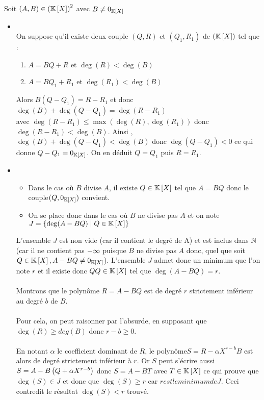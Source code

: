 \begin{dem}
    Soit \(\left(A,B\right) \in \left(\mathbb{K} \left[X\right]\right)^2\) avec \(B \neq 0_{\mathbb{K} \left[X\right]}\)
    \begin{itemize}
        \item \unicite\\
        On suppose qu'il existe deux couple \((Q,R)\) et \((Q_1, R_1)\) de \(\left(\mathbb{K}\left[X\right]\right)\) tel que : 
        \begin{enumerate}
            \item \(A = BQ + R\) et \(\deg(R)<\deg(B)\)
            \item \(A = BQ_1 + R_1\) et \(\deg(R_1)<\deg(B)\)
        \end{enumerate}
        Alors \(B(Q-Q_1) = R-R_1\) et donc \(\deg(B) + \deg( Q-Q_1) = \deg(R-R_1)\)\\
        avec \(\deg(R-R_1) \leq \max(\deg(R),\deg(R_1))\) donc \(\deg(R-R_1) < \deg(B)\).
        Ainsi , \(\deg(B) + \deg( Q-Q_1) < \deg(B)\) donc \(\deg( Q-Q_1) < 0\) ce qui donne \(Q - Q_1 = 0 _{\mathbb{K} \left[X\right]}\). On en déduit \(Q = Q_1\) puis \(R = R_1\).
        \item \existence
        \begin{itemize}
            \item Dans le cas où \(B\) divise \(A\), il existe \(Q \in \mathbb{K} \left[X\right]\) tel que \(A = BQ\) donc le couple\( (Q, 0_{\mathbb{K}\left[X\right]})\) convient.
            \item On se place donc dans le cas où \(B\) ne divise pas \(A\) et on note \(J = \left\lbrace\deg (A - BQ) \;\middle|\; Q \in \mathbb{K} \left[X\right]\right\rbrace\)
        \end{itemize}
        L’ensemble \(J\) est non vide (car il contient le degré de \(\)A) et est inclus dans \(\mathbb{N}\) (car il ne contient pas \(-\infty\) puisque \(B\) ne divise pas \(A\) donc, quel que soit \(Q \in \mathbb{K} \left[X\right], A - BQ\neq 0_{\mathbb{K}\left[X\right]}\)). L’ensemble \(J\) admet donc un minimum que l’on note \(r\) et il existe donc \(Q Q \in \mathbb{K} \left[X\right]\) tel que \(\deg (A - BQ) = r\).\\~\\
        Montrons que le polynôme \(R = A - BQ\) est de degré \(r\) strictement inférieur au degré \(b\) de \(B\).\\~\\
        Pour cela, on peut raisonner par l’absurde, en supposant que \(\deg (R) \geq deg (B)\) donc \(r - b \geq 0\).\\~\\
        En notant \(\alpha\) le coefficient dominant de \(R\), le polynôme\( S = R - \alpha X^{r-b}B\) est alors de degré strictement inférieur à \(r\). Or \(S\) peut s’écrire aussi \(S = A - B\left(Q + \alpha X^{r-b}\right)\) donc \(S = A - BT\) avec \(T \in \mathbb{K} \left[X\right]\) ce qui prouve que \(\deg (S) \in J\) et donc que \(\deg (S) \geq r\) car \(r est le minimum de J\). Ceci contredit le résultat \(\deg (S) < r\) trouvé.\\~\\

\end{itemize}
\end{dem}
